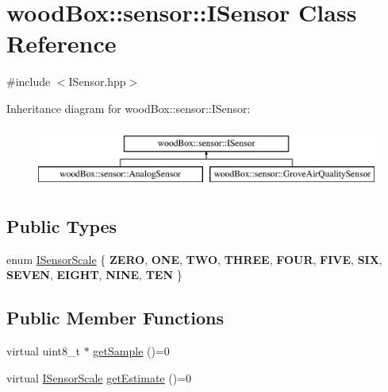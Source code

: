 \hypertarget{classwood_box_1_1sensor_1_1_i_sensor}{}\section{wood\+Box\+:\+:sensor\+:\+:I\+Sensor Class Reference}
\label{classwood_box_1_1sensor_1_1_i_sensor}


{\ttfamily \#include $<$I\+Sensor.\+hpp$>$}

Inheritance diagram for wood\+Box\+:\+:sensor\+:\+:I\+Sensor\+:\begin{figure}[H]
\begin{center}
\leavevmode
\includegraphics[height=2.000000cm]{classwood_box_1_1sensor_1_1_i_sensor}
\end{center}
\end{figure}
\subsection*{Public Types}
\begin{DoxyCompactItemize}
\item 
enum \mbox{\hyperlink{classwood_box_1_1sensor_1_1_i_sensor_aa377bda61ed0d4a1d7e1a7bffe459452}{I\+Sensor\+Scale}} \{ \newline
{\bfseries Z\+E\+RO}, 
{\bfseries O\+NE}, 
{\bfseries T\+WO}, 
{\bfseries T\+H\+R\+EE}, 
\newline
{\bfseries F\+O\+UR}, 
{\bfseries F\+I\+VE}, 
{\bfseries S\+IX}, 
{\bfseries S\+E\+V\+EN}, 
\newline
{\bfseries E\+I\+G\+HT}, 
{\bfseries N\+I\+NE}, 
{\bfseries T\+EN}
 \}
\end{DoxyCompactItemize}
\subsection*{Public Member Functions}
\begin{DoxyCompactItemize}
\item 
virtual uint8\+\_\+t $\ast$ \mbox{\hyperlink{classwood_box_1_1sensor_1_1_i_sensor_a9de8041b991b76cc2f6fcc3b6a1bf363}{get\+Sample}} ()=0
\item 
virtual \mbox{\hyperlink{classwood_box_1_1sensor_1_1_i_sensor_aa377bda61ed0d4a1d7e1a7bffe459452}{I\+Sensor\+Scale}} \mbox{\hyperlink{classwood_box_1_1sensor_1_1_i_sensor_afb01c2473efc4a823bf5dada0048d2bc}{get\+Estimate}} ()=0
\end{DoxyCompactItemize}



